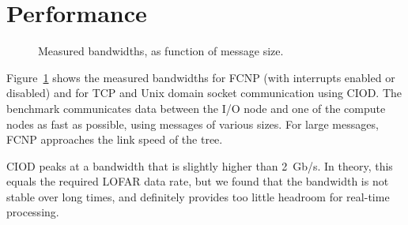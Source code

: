 \documentclass[journal]{IEEEtran}
\begin{document}


\section{Performance}
\label{sec:performance}

\begin{figure}[t]
\hfill
{}
\caption{Measured bandwidths, as function of message size.}
\label{fig:performance}
\end{figure}

Figure~\ref{fig:performance} shows the measured bandwidths for FCNP (with
interrupts enabled or disabled) and for TCP and Unix domain socket
communication using CIOD.
The benchmark communicates data between the I/O node and one of the compute
nodes as fast as possible, using messages of various sizes.
For large messages, FCNP approaches the link speed of the tree.

CIOD peaks at a bandwidth that is slightly higher than 2~Gb/s.
In theory, this equals the required LOFAR data rate, but we found that the
bandwidth is not stable over long times, and definitely provides too little
headroom for real-time processing.
\end{document}
